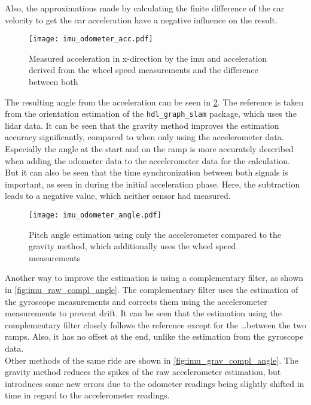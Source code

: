 Also, the approximations made by calculating the finite difference of the car velocity to get the car acceleration have a negative influence on the result.
\begin{figure}[htbp]
	\centering
	\texttt{[image: imu\_odometer\_acc.pdf]}
	\caption[Acceleration from \gls{imu} and odometer]{Measured acceleration in x-direction by the \gls{imu} and acceleration derived from the wheel speed measurements and the difference between both}
	\label{fig:imu_odometer_acc}
\end{figure}
The resulting angle from the acceleration can be seen in \cref{fig:imu_odometer_angle}.
The reference is taken from the orientation estimation of the \texttt{hdl\_graph\_slam} package, which uses the \gls{lidar} data.
It can be seen that the gravity method improves the estimation accuracy significantly, compared to when only using the accelerometer data.
Especially the angle at the start and on the ramp is more accurately described when adding the odometer data to the accelerometer data for the calculation.
But it can also be seen that the time synchronization between both signals is important, as seen in during the initial acceleration phase.
Here, the subtraction leads to a negative value, which neither sensor had measured.\\
\begin{figure}[htbp]
	\centering
	\texttt{[image: imu\_odometer\_angle.pdf]}
	\caption[Gravity method]{Pitch angle estimation using only the accelerometer compared to the gravity method, which additionally uses the wheel speed measurements}
	\label{fig:imu_odometer_angle}
\end{figure}
Another way to improve the estimation is using a complementary filter, as shown in \cref{fig:imu_raw_compl_angle}.
The complementary filter uses the estimation of the gyroscope measurements and corrects them using the accelerometer measurements to prevent drift.
It can be seen that the estimation using the complementary filter closely follows the reference except for the \dots between the two ramps.
Also, it has no offset at the end, unlike the estimation from the gyroscope data.\\
Other methods of the same ride are shown in \cref{fig:imu_grav_compl_angle}.
The gravity method reduces the spikes of the raw accelerometer estimation, but introduces some new errors due to the odometer readings being slightly shifted in time in regard to the accelerometer readings.
